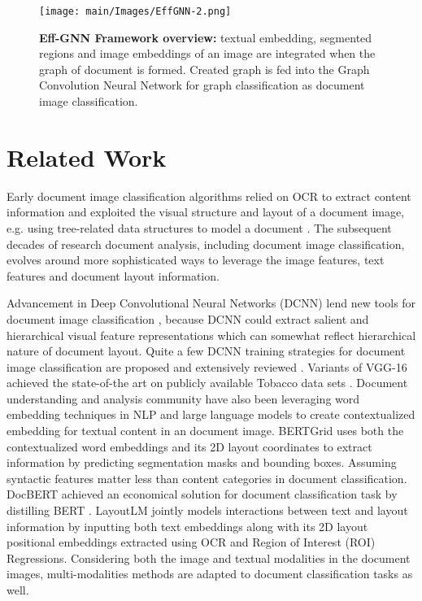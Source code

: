 \documentclass[letterpaper]{article}
\begin{document}
\begin{figure*}[t]
  \begin{center}
    \texttt{[image: main/Images/EffGNN-2.png]}
  \end{center}
  \caption{\textbf{Eff-GNN Framework overview:} textual embedding, segmented regions and image embeddings of an image are integrated when the graph of document is formed. Created graph is fed into the Graph Convolution Neural Network for graph classification as document image classification.}
  \label{fig:overview}
\end{figure*} \section{Related Work}
Early document image classification algorithms relied on OCR to extract content information and exploited the visual structure and layout of a document image, e.g. using tree-related data structures to model a document \cite{Dengel93,ShinDR01,DiligentiFG03}. The subsequent decades of research document analysis, including document image classification, evolves around more sophisticated ways to leverage the image features, text features and document layout information. \par  
Advancement in Deep Convolutional Neural Networks (DCNN) lend new tools for document 
image classification \cite{CNNDOC}, because DCNN could extract salient and hierarchical visual feature representations which can somewhat reflect hierarchical nature of document layout. Quite a few DCNN training strategies for document image classification are proposed and extensively reviewed \cite{CNNDOC,cutting_error_half}. Variants of VGG-16 \cite{DCGNN} achieved the state-of-the art on publicly available Tobacco data sets \cite{LewisAAFGH06}.
Document understanding and analysis community have also been leveraging word embedding techniques \cite{word2vec}  in NLP and large language models \cite{BERT} to create contextualized embedding for textual content in an document image. BERTGrid \cite{bertgrid} uses both the contextualized word embeddings and its 2D layout coordinates to extract information by predicting segmentation masks and bounding boxes. Assuming syntactic features matter less than content categories in document classification. DocBERT achieved an economical solution for document classification task by distilling BERT \cite{DevlinCLT19}.  LayoutLM \cite{layoutLM} jointly models interactions between text and layout information by inputting both text embeddings along with its 2D layout positional embeddings extracted using OCR and Region of Interest (ROI) Regressions. Considering both the image and textual modalities in the document images, multi-modalities methods \cite {multimodal_classification,end2end_multimodal_extraction} are adapted to document classification tasks as well. \par
\end{document}

